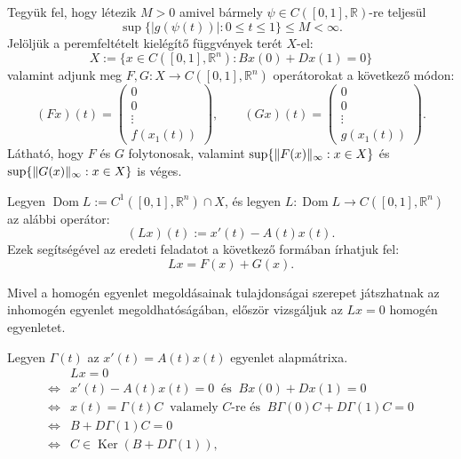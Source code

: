 \documentclass[oneside, titlepage, 12pt, a4paper]{report}
\DeclareMathOperator{\Ker}{Ker}	%
\DeclareMathOperator{\Dom}{Dom}	%
\DeclarePairedDelimiter\norm{\lVert}{\rVert}	%
\begin{document}
Tegyük fel, hogy létezik $M > 0$ amivel bármely $\psi \in C([0, 1], \mathbb{R})$-re teljesül
\begin{equation*}
\sup \{ |g(\psi(t))| : 0 \le t \le 1 \} \le M < \infty.
\end{equation*}
Jelöljük a peremfeltételt kielégítő függvények terét $X$-el:
\begin{equation*}
X := \{ x \in C([0, 1], \mathbb{R}^n) : Bx(0) + Dx(1) = 0 \}
\end{equation*}
valamint adjunk meg $F, G : X \rightarrow C([0, 1], \mathbb{R}^n)$ operátorokat a következő módon:
\begin{equation*}
(Fx)(t) = \left(
\begin{array}{c}
0 \\
0 \\
\vdots \\
f(x_1(t))
\end{array}
\right), \qquad
(Gx)(t) = \left(
\begin{array}{c}
0 \\
0 \\
\vdots \\
g(x_1(t))
\end{array}
\right).
\end{equation*}
Látható, hogy $F$ és $G$ folytonosak, valamint $\sup \{ \norm{F(x)}_\infty : x \in X\}$ és $\sup \{ \norm{G(x)}_\infty : x \in X\}$ is véges. \par
Legyen $\Dom L := C^1([0, 1], \mathbb{R}^n) \cap X$, és legyen $L : \Dom L \rightarrow C([0,1], \mathbb{R}^n)$ az alábbi operátor:
\begin{equation*}
(Lx)(t) := x'(t) - A(t) x(t).
\end{equation*}
Ezek segítségével az eredeti feladatot a következő formában írhatjuk fel:
\begin{equation}
Lx = F(x) + G(x).
\end{equation} \par
Mivel a homogén egyenlet megoldásainak tulajdonságai szerepet játszhatnak az inhomogén egyenlet megoldhatóságában, először vizsgáljuk az $Lx = 0$ homogén egyenletet. \par
Legyen $\Gamma(t)$ az $x'(t) = A(t) x(t)$ egyenlet alapmátrixa.
\begin{align*}
&Lx = 0 \\
\Leftrightarrow & x'(t) - A(t) x(t) = 0 \> \text{ és } \> Bx(0) + Dx(1) = 0 \\
\Leftrightarrow & x(t) = \Gamma(t) C \> \text{ valamely $C$-re és } \> B\Gamma(0)C + D\Gamma(1)C = 0 \\
\Leftrightarrow & B + D\Gamma(1)C = 0 \\
\Leftrightarrow & C \in \Ker (B + D\Gamma(1)),
\end{align*}
\end{document}
